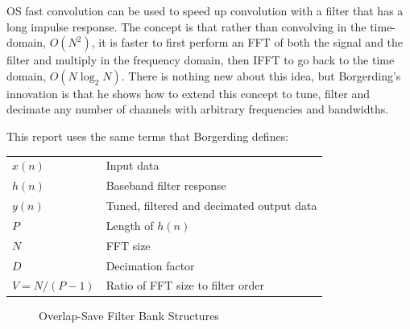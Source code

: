 \documentclass[12pt]{report}
\begin{document}
OS fast convolution can be used to speed up convolution with
a filter that has a long impulse response. The concept is that rather than
convolving in the time-domain, $O(N^2)$, it is faster to first
perform an FFT of both the signal and the filter and multiply in the frequency
domain, then IFFT to go back to the time domain, $O(N\log_2N)$.
There is nothing new about this idea, but Borgerding's innovation is that he
shows how to extend this concept to tune, filter and decimate any number of
channels with arbitrary frequencies and bandwidths.

This report uses the same terms that Borgerding defines:

\begin{tabular}{ll}
    $x(n)$        & Input data \\
    $h(n)$        & Baseband filter response \\
    $y(n)$        & Tuned, filtered and decimated output data \\
    $P$           & Length of $h(n)$ \\
    $N$           & FFT size \\
    $D$           & Decimation factor \\
    $V = N/(P-1)$ & Ratio of FFT size to filter order \\
\end{tabular}

\begin{figure}[h!]
\centerline{
    \hfill
}
\caption{Overlap-Save Filter Bank Structures}
\label{fig:overlap_save_filter_banks}
\end{figure}
\end{document}
